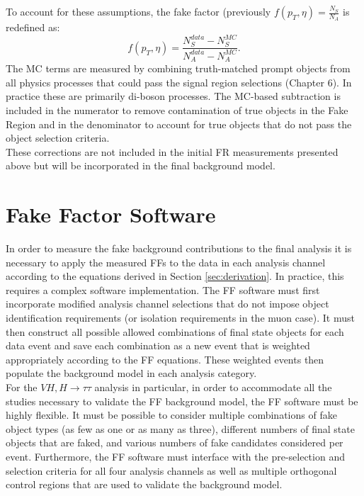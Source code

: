 To account for these assumptions, the fake factor (previously $f(p_T,\eta)=\frac{N_S}{N_A}$ is redefined as:
\begin{equation*}
    f(p_T,\eta)=\frac{N_S^{data}-N_S^{MC}}{N_A^{data}-N_A^{MC}}.
\end{equation*}
\noindent The MC terms are measured by combining truth-matched prompt objects from all physics processes that could pass the signal region selections (Chapter 6). In practice these are primarily di-boson processes. The MC-based subtraction is included in the numerator to remove contamination of true objects in the Fake Region and in the denominator to account for true objects that do not pass the object selection criteria.\\

These corrections are not included in the initial FR measurements presented above but will be incorporated in the final background model.

\section{Fake Factor Software}
In order to measure the fake background contributions to the final analysis it is necessary to apply the measured FFs to the data in each analysis channel according to the equations derived in Section \ref{sec:derivation}. In practice, this requires a complex software implementation. The FF software must first incorporate modified analysis channel selections that do not impose object identification requirements (or isolation requirements in the muon case). It must then construct all possible allowed combinations of final state objects for each data event and save each combination as a new event that is weighted appropriately according to the FF equations. These weighted events then populate the background model in each analysis category.\\

For the $VH,H\rightarrow\tau\tau$ analysis in particular, in order to accommodate all the studies necessary to validate the FF background model, the FF software must be highly flexible. It must be possible to consider multiple combinations of fake object types (as few as one or as many as three),  different numbers of final state objects that are faked, and various numbers of fake candidates considered per event. Furthermore, the FF software must interface with the pre-selection and selection criteria for all four analysis channels as well as multiple orthogonal control regions that are used to validate the background model.\\

